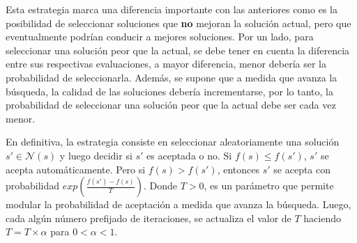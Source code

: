 Esta estrategia marca una diferencia importante con las anteriores como es la
posibilidad de seleccionar soluciones que \textbf{no} mejoran la soluci\'on
actual, pero que eventualmente podr\'ian conducir a mejores soluciones. Por un
lado, para seleccionar una soluci\'on peor que la actual, se debe tener en
cuenta la diferencia entre sus respectivas evaluaciones, a mayor diferencia,
menor deber\'ia ser la probabilidad de seleccionarla. Adem\'as, se supone que a
medida que avanza la b\'usqueda, la calidad de las soluciones deber\'ia
incrementarse, por lo tanto, la probabilidad de seleccionar una soluci\'on peor
que la actual debe ser cada vez menor.

En definitiva, la estrategia consiste en seleccionar aleatoriamente una
soluci\'on $s' \in \mathcal{N}(s)$ y luego decidir si $s'$ es aceptada o no.
Si $f(s) \leq f(s')$, $s'$ se acepta autom\'aticamente. Pero si $f(s) > f(s')$,
entonces $s'$ se acepta con probabilidad $exp(\frac{f(s') - f(s)}{T})$. Donde $T
> 0$, es un par\'ametro que permite modular la probabilidad de aceptaci\'on a
medida que avanza la b\'usqueda. Luego, cada alg\'un n\'umero prefijado de
iteraciones, se actualiza el valor de $T$ haciendo $T = T\times \alpha$ para $0
< \alpha < 1$.

